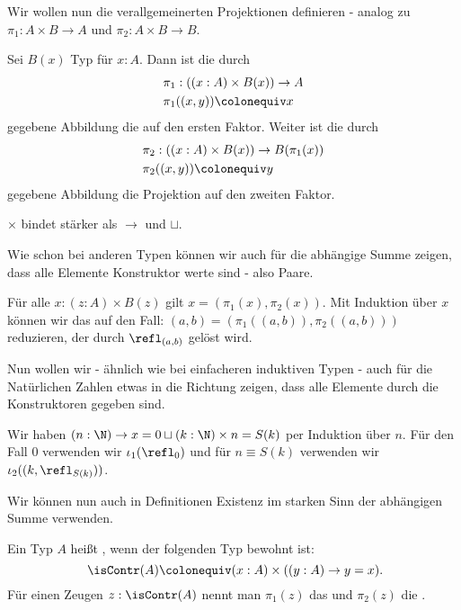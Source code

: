 Wir wollen nun die verallgemeinerten Projektionen definieren - analog zu $\pi_1:A\times B\to A$ und $\pi_2:A\times B\to B$.

\begin{definition}
  Sei $B(x)$ Typ für $x:A$.
  Dann ist die durch
  \begin{align*}
      &\pi_1:((x:A) \times B(x))\to A \\
      &\pi_1((x,y))\colonequiv x
  \end{align*}
  gegebene Abbildung die  auf den ersten Faktor.
  Weiter ist die durch
  \begin{align*}
      &\pi_2:((x:A) \times B(x))\to B(\pi_1(x)) \\
      &\pi_2((x,y))\colonequiv y
  \end{align*}
  gegebene Abbildung die Projektion auf den zweiten Faktor.
\end{definition}

\begin{konvention}
  $\times$ bindet stärker als $\to$ und $\sqcup$.
\end{konvention}

Wie schon bei anderen Typen können wir auch für die abhängige Summe zeigen, dass alle Elemente Konstruktor werte sind - also Paare.

\begin{bemerkung}
  Für alle $x:(z:A)\times B(z)$ gilt $x=(\pi_1(x),\pi_2(x))$.
  Mit Induktion über $x$ können wir das auf den Fall: $(a,b)=(\pi_1((a,b)),\pi_2((a,b)))$ reduzieren, der durch $\refl_{(a,b)}$ gelöst wird.
\end{bemerkung}

Nun wollen wir - ähnlich wie bei einfacheren induktiven Typen - auch für die Natürlichen Zahlen etwas in die Richtung zeigen, dass alle Elemente durch die Konstruktoren gegeben sind.

\begin{bemerkung}
  Wir haben $(n:\N)\to x=0 \sqcup (k:\N)\times n=S(k)$ per Induktion über $n$.
  Für den Fall $0$ verwenden wir $\iota_1(\refl_0)$ und für $n\equiv S(k)$ verwenden wir $\iota_2((k,\refl_{S(k)}))$.
\end{bemerkung}

Wir können nun auch in Definitionen Existenz im starken Sinn der abhängigen Summe verwenden.

\begin{definition}
  Ein Typ $A$ heißt \index{$\isContr$}, wenn der folgenden Typ bewohnt ist:
\[
  \mathrm{\isContr}(A)\colonequiv (x:A)\times ((y:A)\to y=x)\rlap{.}
\]
  Für einen Zeugen $z:\isContr(A)$ nennt man $\pi_1(z)$ das 
  und $\pi_2(z)$ die .
\end{definition}

